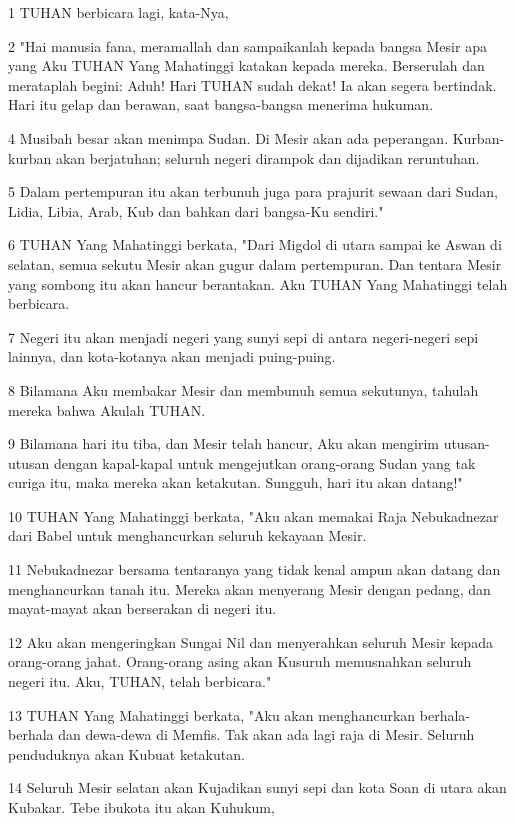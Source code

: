 \par 1 TUHAN berbicara lagi, kata-Nya,
\par 2 "Hai manusia fana, meramallah dan sampaikanlah kepada bangsa Mesir apa yang Aku TUHAN Yang Mahatinggi katakan kepada mereka. Berserulah dan merataplah begini: Aduh! Hari TUHAN sudah dekat! Ia akan segera bertindak. Hari itu gelap dan berawan, saat bangsa-bangsa menerima hukuman.
\par 4 Musibah besar akan menimpa Sudan. Di Mesir akan ada peperangan. Kurban-kurban akan berjatuhan; seluruh negeri dirampok dan dijadikan reruntuhan.
\par 5 Dalam pertempuran itu akan terbunuh juga para prajurit sewaan dari Sudan, Lidia, Libia, Arab, Kub dan bahkan dari bangsa-Ku sendiri."
\par 6 TUHAN Yang Mahatinggi berkata, "Dari Migdol di utara sampai ke Aswan di selatan, semua sekutu Mesir akan gugur dalam pertempuran. Dan tentara Mesir yang sombong itu akan hancur berantakan. Aku TUHAN Yang Mahatinggi telah berbicara.
\par 7 Negeri itu akan menjadi negeri yang sunyi sepi di antara negeri-negeri sepi lainnya, dan kota-kotanya akan menjadi puing-puing.
\par 8 Bilamana Aku membakar Mesir dan membunuh semua sekutunya, tahulah mereka bahwa Akulah TUHAN.
\par 9 Bilamana hari itu tiba, dan Mesir telah hancur, Aku akan mengirim utusan-utusan dengan kapal-kapal untuk mengejutkan orang-orang Sudan yang tak curiga itu, maka mereka akan ketakutan. Sungguh, hari itu akan datang!"
\par 10 TUHAN Yang Mahatinggi berkata, "Aku akan memakai Raja Nebukadnezar dari Babel untuk menghancurkan seluruh kekayaan Mesir.
\par 11 Nebukadnezar bersama tentaranya yang tidak kenal ampun akan datang dan menghancurkan tanah itu. Mereka akan menyerang Mesir dengan pedang, dan mayat-mayat akan berserakan di negeri itu.
\par 12 Aku akan mengeringkan Sungai Nil dan menyerahkan seluruh Mesir kepada orang-orang jahat. Orang-orang asing akan Kusuruh memusnahkan seluruh negeri itu. Aku, TUHAN, telah berbicara."
\par 13 TUHAN Yang Mahatinggi berkata, "Aku akan menghancurkan berhala-berhala dan dewa-dewa di Memfis. Tak akan ada lagi raja di Mesir. Seluruh penduduknya akan Kubuat ketakutan.
\par 14 Seluruh Mesir selatan akan Kujadikan sunyi sepi dan kota Soan di utara akan Kubakar. Tebe ibukota itu akan Kuhukum,
